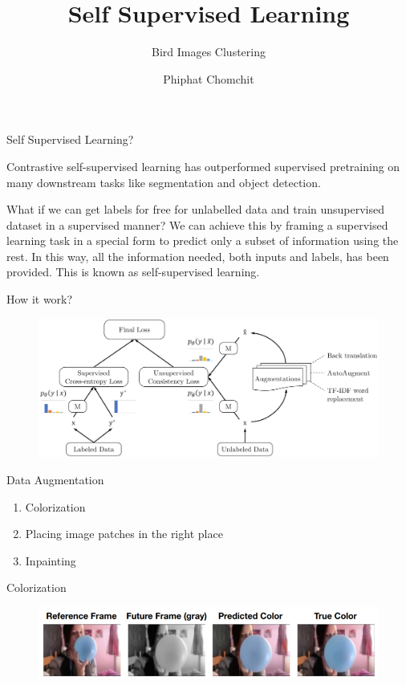 \documentclass{beamer}
\title{Self Supervised Learning}
\subtitle{Bird Images Clustering}
\author{Phiphat Chomchit}
\institute{CMU}
\date{}
\begin{document}
	\begin{frame}
		\titlepage
	\end{frame}

	\begin{frame}[t]{Self Supervised Learning?}\vspace{10pt}
	 
		Contrastive self-supervised learning has outperformed supervised pretraining on many downstream tasks like segmentation and object detection.
		
		What if we can get labels for free for unlabelled data and train unsupervised dataset in a supervised manner? We can achieve this by framing a supervised learning task in a special form to predict only a subset of information using the rest. In this way, all the information needed, both inputs and labels, has been provided. This is known as self-supervised learning.
	
	\end{frame}
	
	\begin{frame}[t]{How it work?}\vspace{4pt}
		\begin{figure}
			\centering
			\includegraphics[scale=0.2]{google_semi.jpg}
		\end{figure}
	\end{frame}
	\begin{frame}[t]{Data Augmentation}
	\begin{enumerate}
		\item Colorization
		\item Placing image patches in the right place
		\item Inpainting
	\end{enumerate}
	\end{frame}
	
	\begin{frame}{Colorization}\vspace{4pt}
		 \begin{figure}
		 	\centering
		 	\includegraphics[scale=1]{color.png}
		 \end{figure}
	\end{frame}
\end{document}
